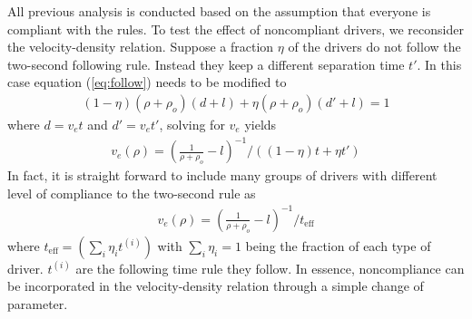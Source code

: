 All previous analysis is conducted based on the assumption that everyone is compliant with the rules. To test the effect of noncompliant drivers, we reconsider the velocity-density relation. Suppose a fraction $\eta$ of the drivers do not follow the two-second following rule. Instead they keep a different separation time $t'$. In this case equation (\ref{eq:follow}) needs to be modified to 
\begin{align}
& (1-\eta)(\rho + \rho_o)(d+l)+\eta(\rho + \rho_o)(d'+l) = 1 & \label{eq:follow1}
\end{align}
where $d = v_e t$ and $d' = v_e t'$, solving for $v_e$ yields
\begin{align}
	& v_e(\rho) = (\frac{1}{\rho+\rho_o}-l)^{-1}/((1-\eta)t+\eta t') &
\end{align}
In fact, it is straight forward to include many groups of drivers with different level of compliance to the two-second rule as 
\begin{align}
	& v_e(\rho) = (\frac{1}{\rho+\rho_o}-l)^{-1}/t_{\text{eff}} &
\end{align} 
where $t_{\text{eff}}=(\sum\limits_{i} \eta_i t^{(i)} )$ with $\sum\limits_i \eta_i=1$ being the fraction of each type of driver. $t^{(i)}$ are the following time rule they follow. In essence, noncompliance can be incorporated in the velocity-density relation through a simple change of parameter.
